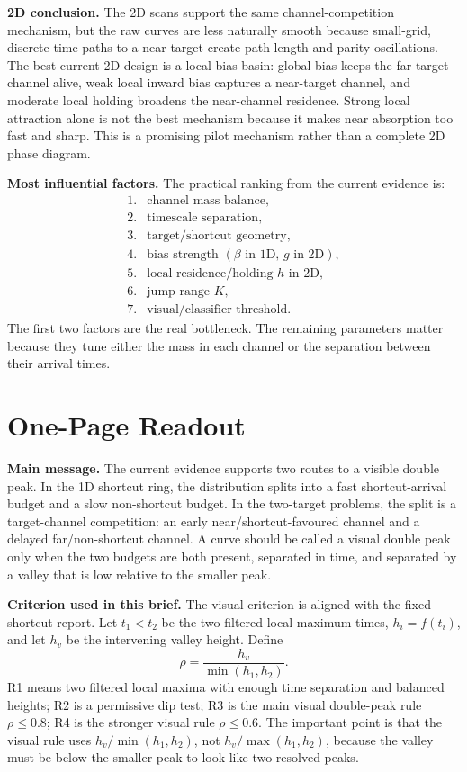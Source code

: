 \documentclass[11pt]{article}
\begin{document}
\textbf{2D conclusion.}
The 2D scans support the same channel-competition mechanism, but the raw
curves are less naturally smooth because small-grid, discrete-time paths to a
near target create path-length and parity oscillations. The best current 2D
design is a local-bias basin: global bias keeps the far-target channel alive,
weak local inward bias captures a near-target channel, and moderate local
holding broadens the near-channel residence. Strong local attraction alone is
not the best mechanism because it makes near absorption too fast and sharp.
This is a promising pilot mechanism rather than a complete 2D phase diagram.

\textbf{Most influential factors.}
The practical ranking from the current evidence is:
\[
\begin{array}{rl}
1. & \text{channel mass balance},\\
2. & \text{timescale separation},\\
3. & \text{target/shortcut geometry},\\
4. & \text{bias strength }(\beta\text{ in 1D, }g\text{ in 2D}),\\
5. & \text{local residence/holding }h\text{ in 2D},\\
6. & \text{jump range }K,\\
7. & \text{visual/classifier threshold}.
\end{array}
\]
The first two factors are the real bottleneck. The remaining parameters matter
because they tune either the mass in each channel or the separation between
their arrival times.

\clearpage

\section*{One-Page Readout}

\textbf{Main message.}
The current evidence supports two routes to a visible double peak. In the 1D
shortcut ring, the distribution splits into a fast shortcut-arrival budget and
a slow non-shortcut budget. In the two-target problems, the split is a
target-channel competition: an early near/shortcut-favoured channel and a
delayed far/non-shortcut channel. A curve should be called a visual double peak
only when the two budgets are both present, separated in time, and separated by
a valley that is low relative to the smaller peak.

\textbf{Criterion used in this brief.}
The visual criterion is aligned with the fixed-shortcut report. Let \(t_1<t_2\)
be the two filtered local-maximum times, \(h_i=f(t_i)\), and let \(h_v\) be
the intervening valley height. Define
\[
  \rho=\frac{h_v}{\min(h_1,h_2)}.
\]
R1 means two filtered local maxima with enough time separation and balanced
heights; R2 is a permissive dip test; R3 is the main visual double-peak rule
\(\rho\le0.8\); R4 is the stronger visual rule \(\rho\le0.6\). The important
point is that the visual rule uses \(h_v/\min(h_1,h_2)\), not
\(h_v/\max(h_1,h_2)\), because the valley must be below the smaller peak to
look like two resolved peaks.
\end{document}
